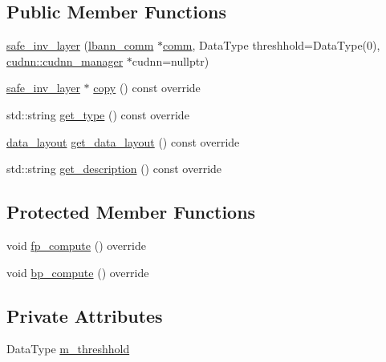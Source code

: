 \subsection*{Public Member Functions}
\begin{DoxyCompactItemize}
\item 
\hyperlink{classlbann_1_1safe__inv__layer_a8568b80fcabd1427eaa4b4deed294f5e}{safe\+\_\+inv\+\_\+layer} (\hyperlink{classlbann_1_1lbann__comm}{lbann\+\_\+comm} $\ast$\hyperlink{file__io_8cpp_ab048c6f9fcbcfaa57ce68b00263dbebe}{comm}, Data\+Type threshhold=Data\+Type(0), \hyperlink{classlbann_1_1cudnn_1_1cudnn__manager}{cudnn\+::cudnn\+\_\+manager} $\ast$cudnn=nullptr)
\item 
\hyperlink{classlbann_1_1safe__inv__layer}{safe\+\_\+inv\+\_\+layer} $\ast$ \hyperlink{classlbann_1_1safe__inv__layer_aaaf9a3b769c579122cd361caa65c7958}{copy} () const override
\item 
std\+::string \hyperlink{classlbann_1_1safe__inv__layer_a6ee075564c6b683a42fc77b16638a588}{get\+\_\+type} () const override
\item 
\hyperlink{base_8hpp_a786677cbfb3f5677b4d84f3056eb08db}{data\+\_\+layout} \hyperlink{classlbann_1_1safe__inv__layer_aa82e763a902004d7b0f05b390c3bd45f}{get\+\_\+data\+\_\+layout} () const override
\item 
std\+::string \hyperlink{classlbann_1_1safe__inv__layer_a1823f1ac48228eec1fa0c1578b2b1ab3}{get\+\_\+description} () const override
\end{DoxyCompactItemize}
\subsection*{Protected Member Functions}
\begin{DoxyCompactItemize}
\item 
void \hyperlink{classlbann_1_1safe__inv__layer_a070fe64c2a605eb5624d509740de1c32}{fp\+\_\+compute} () override
\item 
void \hyperlink{classlbann_1_1safe__inv__layer_a6c9d917f226b718733ee60da9da0291b}{bp\+\_\+compute} () override
\end{DoxyCompactItemize}
\subsection*{Private Attributes}
\begin{DoxyCompactItemize}
\item 
Data\+Type \hyperlink{classlbann_1_1safe__inv__layer_ae8978232b726f450b961a63e5ff33279}{m\+\_\+threshhold}
\end{DoxyCompactItemize}
